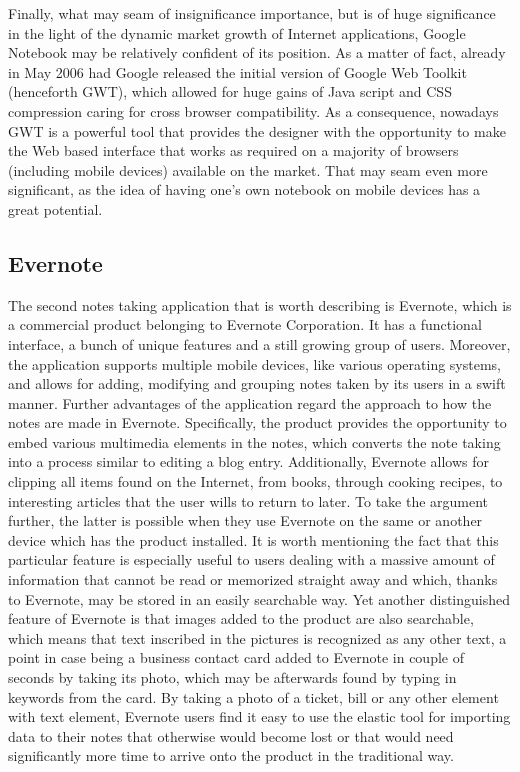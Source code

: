Finally, what may seam of insignificance importance, but is of huge significance in the light of the dynamic market growth of Internet applications, Google Notebook may be relatively confident of its position. As a matter of fact, already in May 2006 had Google released the initial version of Google Web Toolkit (henceforth GWT), which allowed for huge gains of Java script and CSS compression caring for cross browser compatibility. As a consequence, nowadays GWT is a powerful tool that provides the designer with the opportunity to make the Web based interface that works as required on a majority of browsers (including mobile devices) available on the market. That may seam even more significant, as the idea of having one's own notebook on mobile devices has a great potential. 
\newpage
\subsection{Evernote}\label{subsec:evernote}
The second notes taking application that is worth describing is Evernote, which is a commercial product belonging to Evernote Corporation. It has a functional interface, a bunch of unique features and a still growing group of users. Moreover, the application supports multiple mobile devices, like various operating systems, and allows for adding, modifying and grouping notes taken by its users in a swift manner. Further advantages of the application regard the approach to how the notes are made in Evernote. Specifically, the product provides the opportunity to embed various multimedia elements in the notes, which converts the note taking into a process similar to editing a blog entry. Additionally, Evernote allows for clipping all items found on the Internet, from books, through cooking recipes, to interesting articles that the user wills to return to later. To take the argument further, the latter is possible when they use Evernote on the same or another device which has the product installed. It is worth mentioning the fact that this particular feature is especially useful to users dealing with a massive amount of information that cannot be read or memorized straight away and which, thanks to Evernote, may be stored in an easily searchable way. Yet another distinguished feature of Evernote is that images added to the product are also searchable, which means that text inscribed in the pictures is recognized as any other text, a point in case being a business contact card added to Evernote in couple of seconds by taking its photo, which may be afterwards found by typing in keywords from the card. By taking a photo of a ticket, bill or any other element with text element, Evernote users find it easy to use the elastic tool for importing data to their notes that otherwise would become lost or that would need significantly more time to arrive onto the product in the traditional way.

